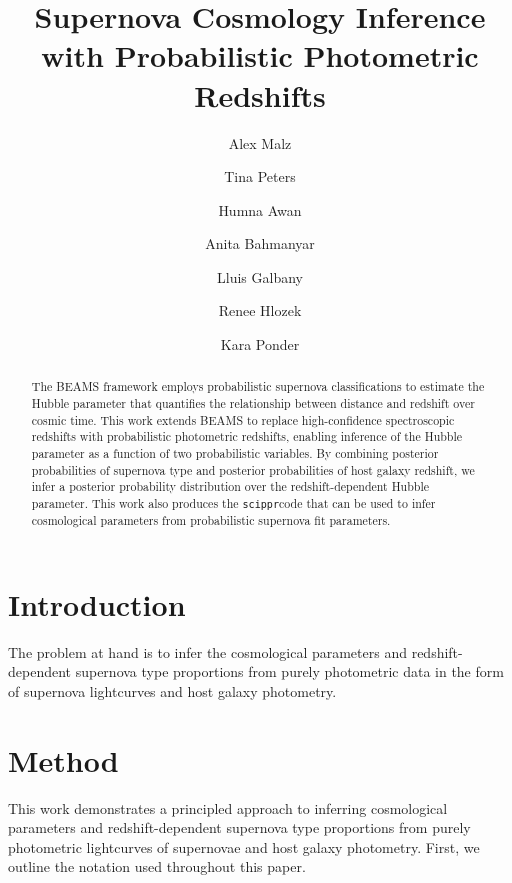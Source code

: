 \documentclass[12pt, onecolumn]{emulateapj}
\newcommand{\scippr}{\texttt{scippr}}
\begin{document}
\title{Supernova Cosmology Inference with Probabilistic Photometric Redshifts}

\author{Alex Malz}
\author{Tina Peters}
\author{Humna Awan}
\author{Anita Bahmanyar}
\author{Lluis Galbany}
\author{Renee Hlozek}
\author{Kara Ponder}

\begin{abstract}
The BEAMS framework employs probabilistic supernova classifications to estimate the Hubble parameter that quantifies the relationship between distance and redshift over cosmic time.  This work extends BEAMS to replace high-confidence spectroscopic redshifts with probabilistic photometric redshifts, enabling inference of the Hubble parameter as a function of two probabilistic variables.  By combining posterior probabilities of supernova type and posterior probabilities of host galaxy redshift, we infer a posterior probability distribution over the redshift-dependent Hubble parameter.  This work also produces the \scippr code that can be used to infer cosmological parameters from probabilistic supernova fit parameters.
\end{abstract}

\keywords{}

\section{Introduction}
\label{sec:intro}

\citet{kunz_bayesian_2007, kelly_flexible_2008, hlozek_photometric_2012}

The problem at hand is to infer the cosmological parameters and redshift-dependent supernova type proportions from purely photometric data in the form of supernova lightcurves and host galaxy photometry.

\section{Method}
\label{sec:meth}

This work demonstrates a principled approach to inferring cosmological parameters and redshift-dependent supernova type proportions from purely photometric lightcurves of supernovae and host galaxy photometry.  First, we outline the notation used throughout this paper.
\end{document}
